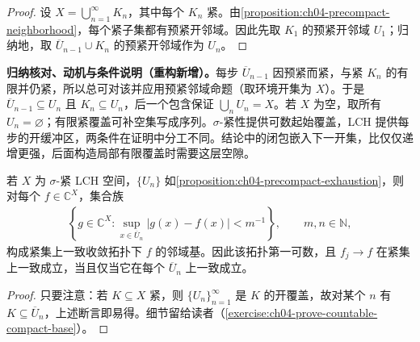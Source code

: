 \documentclass[../../main.tex]{subfiles}%
\begin{document}
\begin{proof}
设 $X=\bigcup_{n=1}^{\infty}K_n$，其中每个 $K_n$ 紧。由\cref{proposition:ch04-precompact-neighborhood}，每个紧子集都有预紧开邻域。因此先取 $K_1$ 的预紧开邻域 $U_1$；归纳地，取 $\overline U_{n-1}\cup K_n$ 的预紧开邻域作为 $U_n$。
\end{proof}
\begin{remark}
\textbf{归纳核对、动机与条件说明（重构新增）。}每步 $\overline U_{n-1}$ 因预紧而紧，与紧 $K_n$ 的有限并仍紧，所以总可对该并应用预紧邻域命题（取环境开集为 $X$）。于是 $\overline U_{n-1}\subseteq U_n$ 且 $K_n\subseteq U_n$，后一个包含保证 $\bigcup_nU_n=X$。若 $X$ 为空，取所有 $U_n=\varnothing$；有限紧覆盖可补空集写成序列。$\sigma$-紧性提供可数起始覆盖，LCH 提供每步的开缓冲区，两条件在证明中分工不同。结论中的闭包嵌入下一开集，比仅仅递增更强，后面构造局部有限覆盖时需要这层空隙。
\end{remark}
\begin{proposition}\label{proposition:ch04-compact-uniform-countable-base}
若 $X$ 为 $\sigma$-紧 LCH 空间，$\{U_n\}$ 如\cref{proposition:ch04-precompact-exhaustion}，则对每个 $f\in\mathbb C^X$，集合族
\begin{align*}
\left\{g\in\mathbb C^X:\sup_{x\in\overline U_n}|g(x)-f(x)|<m^{-1}\right\},
\qquad m,n\in\mathbb N,
\end{align*}
构成紧集上一致收敛拓扑下 $f$ 的邻域基。因此该拓扑第一可数，且 $f_j\to f$ 在紧集上一致成立，当且仅当它在每个 $\overline U_n$ 上一致成立。
\end{proposition}
\begin{proof}
只要注意：若 $K\subseteq X$ 紧，则 $\{U_n\}_{n=1}^{\infty}$ 是 $K$ 的开覆盖，故对某个 $n$ 有 $K\subseteq\overline U_n$，上述断言即易得。细节留给读者（\cref{exercise:ch04-prove-countable-compact-base}）。
\end{proof}
\end{document}
